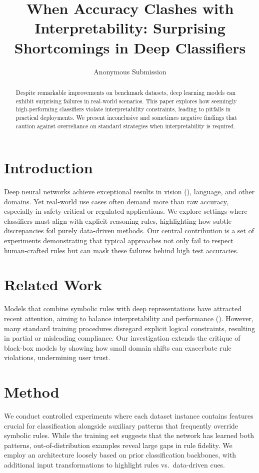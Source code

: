 \documentclass[11pt]{article}
\title{When Accuracy Clashes with Interpretability: Surprising Shortcomings in Deep Classifiers}
\author{Anonymous Submission}
\date{}
\begin{document}
\maketitle

\begin{abstract}
Despite remarkable improvements on benchmark datasets, deep learning models can exhibit surprising failures in real-world scenarios. This paper explores how seemingly high-performing classifiers violate interpretability constraints, leading to pitfalls in practical deployments. We present inconclusive and sometimes negative findings that caution against overreliance on standard strategies when interpretability is required.
\end{abstract}

\section{Introduction}
Deep neural networks achieve exceptional results in vision (\citep{goodfellow2014explaining}), language, and other domains. Yet real-world use cases often demand more than raw accuracy, especially in safety-critical or regulated applications. We explore settings where classifiers must align with explicit reasoning rules, highlighting how subtle discrepancies foil purely data-driven methods. Our central contribution is a set of experiments demonstrating that typical approaches not only fail to respect human-crafted rules but can mask these failures behind high test accuracies.

\section{Related Work}
Models that combine symbolic rules with deep representations have attracted recent attention, aiming to balance interpretability and performance (\citep{kingma2015adam}). However, many standard training procedures disregard explicit logical constraints, resulting in partial or misleading compliance. Our investigation extends the critique of black-box models by showing how small domain shifts can exacerbate rule violations, undermining user trust.

\section{Method}
We conduct controlled experiments where each dataset instance contains features crucial for classification alongside auxiliary patterns that frequently override symbolic rules. While the training set suggests that the network has learned both patterns, out-of-distribution examples reveal large gaps in rule fidelity. We employ an architecture loosely based on prior classification backbones, with additional input transformations to highlight rules vs.\ data-driven cues.
\end{document}
